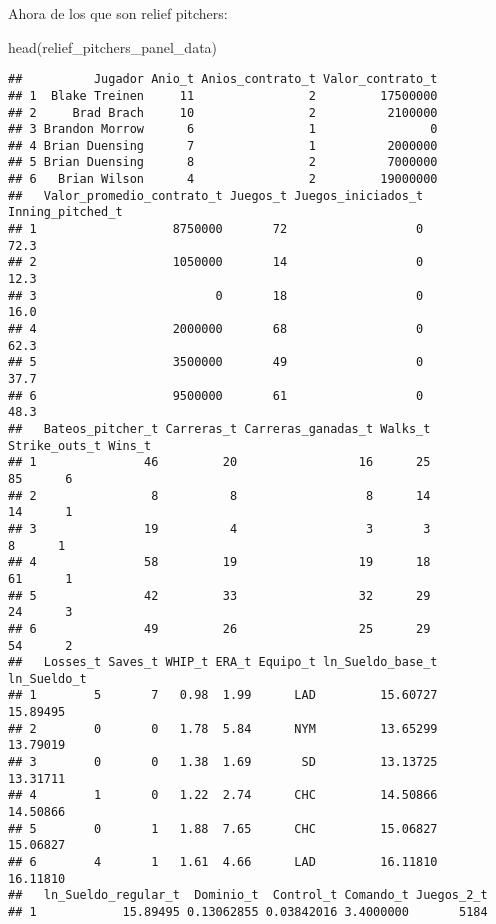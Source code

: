 \documentclass[
]{article}
\newenvironment{Shaded}{\begin{snugshade}}{\end{snugshade}}
\newcommand{\FunctionTok}[1]{\textcolor[rgb]{0.00,0.00,0.00}{#1}}
\newcommand{\NormalTok}[1]{#1}
\begin{document}
Ahora de los que son relief pitchers:

\begin{Shaded}
\begin{Highlighting}[]
\FunctionTok{head}\NormalTok{(relief\_pitchers\_panel\_data)}
\end{Highlighting}
\end{Shaded}

\begin{verbatim}
##          Jugador Anio_t Anios_contrato_t Valor_contrato_t
## 1  Blake Treinen     11                2         17500000
## 2     Brad Brach     10                2          2100000
## 3 Brandon Morrow      6                1                0
## 4 Brian Duensing      7                1          2000000
## 5 Brian Duensing      8                2          7000000
## 6   Brian Wilson      4                2         19000000
##   Valor_promedio_contrato_t Juegos_t Juegos_iniciados_t Inning_pitched_t
## 1                   8750000       72                  0             72.3
## 2                   1050000       14                  0             12.3
## 3                         0       18                  0             16.0
## 4                   2000000       68                  0             62.3
## 5                   3500000       49                  0             37.7
## 6                   9500000       61                  0             48.3
##   Bateos_pitcher_t Carreras_t Carreras_ganadas_t Walks_t Strike_outs_t Wins_t
## 1               46         20                 16      25            85      6
## 2                8          8                  8      14            14      1
## 3               19          4                  3       3             8      1
## 4               58         19                 19      18            61      1
## 5               42         33                 32      29            24      3
## 6               49         26                 25      29            54      2
##   Losses_t Saves_t WHIP_t ERA_t Equipo_t ln_Sueldo_base_t ln_Sueldo_t
## 1        5       7   0.98  1.99      LAD         15.60727    15.89495
## 2        0       0   1.78  5.84      NYM         13.65299    13.79019
## 3        0       0   1.38  1.69       SD         13.13725    13.31711
## 4        1       0   1.22  2.74      CHC         14.50866    14.50866
## 5        0       1   1.88  7.65      CHC         15.06827    15.06827
## 6        4       1   1.61  4.66      LAD         16.11810    16.11810
##   ln_Sueldo_regular_t  Dominio_t  Control_t Comando_t Juegos_2_t
## 1            15.89495 0.13062855 0.03842016 3.4000000       5184

\end{verbatim}
\end{document}
